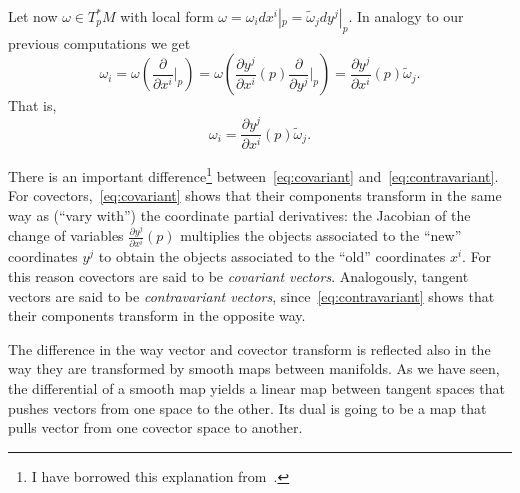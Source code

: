 Let now $\omega\in T_p^*M$ with local form $\omega = \omega_i dx^i|_p = \widetilde \omega_j dy^j|_p$.
In analogy to our previous computations we get
\begin{equation}
  \omega_i
  = \omega\left(\frac{\partial}{\partial x^i}\Big|_p\right)
  = \omega\left(\frac{\partial y^j}{\partial x^i}(p) \frac{\partial}{\partial y^j}\Big|_p\right)
  = \frac{\partial y^j}{\partial x^i}(p) \widetilde\omega_j.
\end{equation}
That is,
\begin{equation}\label{eq:covariant}
  \omega_i = \frac{\partial y^j}{\partial x^i}(p) \widetilde\omega_j.
\end{equation}

There is an important difference\footnote{I have borrowed this explanation from~\cite[Chapter 11]{book:lee}.} between~\eqref{eq:covariant} and~\eqref{eq:contravariant}.
For covectors,~\eqref{eq:covariant} shows that their components transform in the same way as (``vary with'') the coordinate partial derivatives: the Jacobian of the change of variables $\frac{\partial y^j}{\partial x^i}(p)$ multiplies the objects associated to the ``new'' coordinates $y^j$ to obtain the objects associated to the ``old'' coordinates $x^i$.
For this reason covectors are said to be \emph{covariant vectors}.
Analogously, tangent vectors are said to be \emph{contravariant vectors}, since~\eqref{eq:contravariant} shows that their components transform in the opposite way.

The difference in the way vector and covector transform is reflected also in the way they are transformed by smooth maps between manifolds.
As we have seen, the differential of a smooth map yields a linear map between tangent spaces that pushes vectors from one space to the other.
Its dual is going to be a map that pulls vector from one covector space to another.

